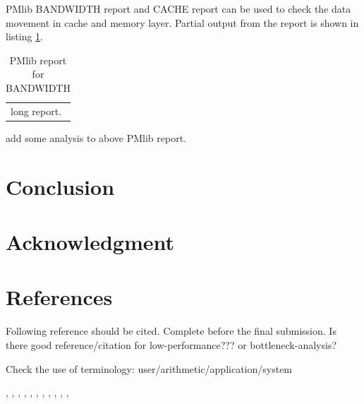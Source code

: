 \documentclass[conference]{IEEEtran}
\begin{document}
PMlib BANDWIDTH report and CACHE report can be used
to check the data movement in cache and memory layer.
Partial output from the report is shown in listing \ref{}.

\begin{table}[bt]
\scriptsize
\caption{PMlib report for BANDWIDTH}
\label{tab:report-BANDWIDTH}
\footnotesize
\begin{tabular}{l} \hline
\scriptsize
long report.


\end{tabular}
\end{table}

{\color{blue}
add some analysis to above PMlib report.
}

\section{Conclusion}

\section*{Acknowledgment}

\section*{References}

{\color{blue}
Following reference should be cited. Complete before the final submission.
Is there good reference/citation for low-performance???
or bottleneck-analysis?
}

{\color{blue} Check the use of terminology: user/arithmetic/application/system}

\cite{PMlib:webpage-public},
\cite{PMlib:webpage-master},
\cite{PMlib:webpage-develop},
\cite{Extrae:webpage},
\cite{Scalasca:2017},
\cite{PAPI:5.6},
\cite{Intel:VTune},
\cite{PGI:Profiler},
\cite{stream:1995},
\cite{Scalasca:2010},
\cite{Williams:2009},



\end{document}

